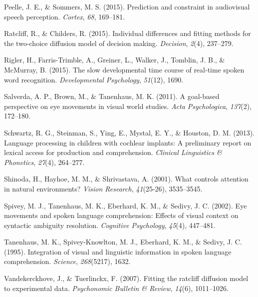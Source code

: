 \documentclass[english,floatsintext,man]{apa6}
\begin{document}
\leavevmode\hypertarget{ref-peelle2015prediction}{}%
Peelle, J. E., \& Sommers, M. S. (2015). Prediction and constraint in
audiovisual speech perception. \emph{Cortex}, \emph{68}, 169--181.

\leavevmode\hypertarget{ref-ratcliff2015individual}{}%
Ratcliff, R., \& Childers, R. (2015). Individual differences and fitting
methods for the two-choice diffusion model of decision making.
\emph{Decision}, \emph{2}(4), 237--279.

\leavevmode\hypertarget{ref-rigler2015slow}{}%
Rigler, H., Farris-Trimble, A., Greiner, L., Walker, J., Tomblin, J. B.,
\& McMurray, B. (2015). The slow developmental time course of real-time
spoken word recognition. \emph{Developmental Psychology}, \emph{51}(12),
1690.

\leavevmode\hypertarget{ref-salverda2011goal}{}%
Salverda, A. P., Brown, M., \& Tanenhaus, M. K. (2011). A goal-based
perspective on eye movements in visual world studies. \emph{Acta
Psychologica}, \emph{137}(2), 172--180.

\leavevmode\hypertarget{ref-schwartz2013language}{}%
Schwartz, R. G., Steinman, S., Ying, E., Mystal, E. Y., \& Houston, D.
M. (2013). Language processing in children with cochlear implants: A
preliminary report on lexical access for production and comprehension.
\emph{Clinical Linguistics \& Phonetics}, \emph{27}(4), 264--277.

\leavevmode\hypertarget{ref-shinoda2001controls}{}%
Shinoda, H., Hayhoe, M. M., \& Shrivastava, A. (2001). What controls
attention in natural environments? \emph{Vision Research},
\emph{41}(25-26), 3535--3545.

\leavevmode\hypertarget{ref-spivey2002eye}{}%
Spivey, M. J., Tanenhaus, M. K., Eberhard, K. M., \& Sedivy, J. C.
(2002). Eye movements and spoken language comprehension: Effects of
visual context on syntactic ambiguity resolution. \emph{Cognitive
Psychology}, \emph{45}(4), 447--481.

\leavevmode\hypertarget{ref-tanenhaus1995integration}{}%
Tanenhaus, M. K., Spivey-Knowlton, M. J., Eberhard, K. M., \& Sedivy, J.
C. (1995). Integration of visual and linguistic information in spoken
language comprehension. \emph{Science}, \emph{268}(5217), 1632.

\leavevmode\hypertarget{ref-vandekerckhove2007fitting}{}%
Vandekerckhove, J., \& Tuerlinckx, F. (2007). Fitting the ratcliff
diffusion model to experimental data. \emph{Psychonomic Bulletin \&
Review}, \emph{14}(6), 1011--1026.
\end{document}

